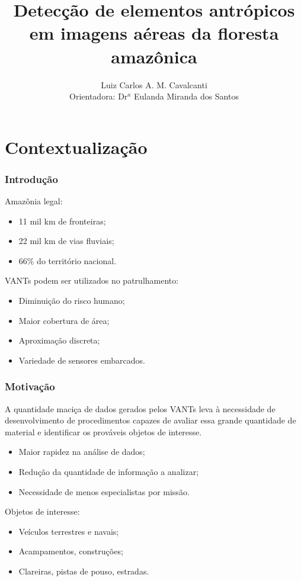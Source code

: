 \documentclass[t]{beamer}
\institute[Universities Here and There] %
{
  Programa de Pós-graduação em Informática\\
  Instituto de Computação\\
  Unversidade Federal do Amazonas
}
\title %
{Detecção de elementos antrópicos em imagens aéreas da floresta amazônica}
\author %
{Luiz Carlos A. M. Cavalcanti
\\Orientadora: Dr$^a$ Eulanda Miranda dos Santos} %
\date[] %
{}
\begin{document}
  \begin{frame}\titlepage\end{frame}


\section{Contextualização}

\begin{frame}[c]
\frametitle{Introdução}
	Amazônia legal:
	\begin{itemize}
		\item 11 mil km de fronteiras;
		\item 22 mil km de vias fluviais;
		\item 66\% do território nacional.
	\end{itemize}

	\vspace{0.5cm}

	VANTs podem ser utilizados no patrulhamento:
	\begin{itemize}
		\item Diminuição do risco humano;
		\item Maior cobertura de área;
		\item Aproximação discreta;
		\item Variedade de sensores embarcados.
	\end{itemize}
\end{frame}

\begin{frame}[c]
\frametitle{Motivação}

A quantidade maciça de dados gerados pelos VANTs leva à necessidade de desenvolvimento de procedimentos capazes de avaliar essa grande quantidade de material e identificar os prováveis objetos de interesse.

\begin{itemize}
	\item Maior rapidez na análise de dados;
	\item Redução da quantidade de informação a analizar;
	\item Necessidade de menos especialistas por missão.
\end{itemize}

Objetos de interesse:
\begin{itemize}
	\item Veículos terrestres e navais;
	\item Acampamentos, construções;
	\item Clareiras, pistas de pouso, estradas.
\end{itemize}



\end{frame}
\end{document}
